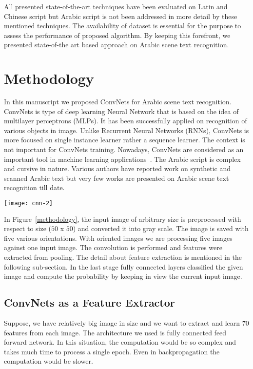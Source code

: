 \documentclass[conference]{IEEEtran}
\begin{document}
All presented state-of-the-art techniques have been evaluated on Latin and Chinese script but Arabic script is not been addressed in more detail by these mentioned techniques. The availability of dataset is essential for the purpose to assess the performance of proposed algorithm.
By keeping this forefront, we presented state-of-the art based approach on Arabic scene text recognition.

\section{Methodology}
In this manuscript we proposed ConvNets for Arabic scene text recognition.
ConvNets is type of deep learning Neural Network that is based on the idea of multilayer perceptrons (MLPs).
It has been successfully applied on recognition of various objects in image.
Unlike Recurrent Neural Networks (RNNs), ConvNets is more focused on single instance learner rather a sequence learner.
The context is not important for ConvNets training.
Nowadays, ConvNets are considered as an important tool in machine learning applications~\cite{str3, str4, str5}.
The Arabic script is complex and cursive in nature.
Various authors have reported work on synthetic and scanned Arabic text but very few works are presented on Arabic scene text recognition till date.
\begin{figure*}[h]
\centering
\texttt{[image: cnn-2]}
\caption{\bf Proposed methodology based on ConvNets}
\label{methodology}
\end{figure*}
In Figure~\ref{methodology}, the input image of arbitrary size is preprocessed with respect to size ($50$ x $50$) and converted it into gray scale.
The image is saved with five various orientations.
With oriented images we are processing five images against one input image.
The convolution is performed and features were extracted from pooling.
The detail about feature extraction is mentioned in the following sub-section.
In the last stage fully connected layers classified the given image and compute the probability by keeping in view the current input image.


\subsection{ConvNets as a Feature Extractor}

Suppose, we have relatively big image in size and we want to extract and learn $70$ features from each image.
The architecture we used is fully connected feed forward network.
In this situation, the computation would be so complex and takes much time to process a single epoch.
Even in backpropagation the computation would be slower.
\end{document}
